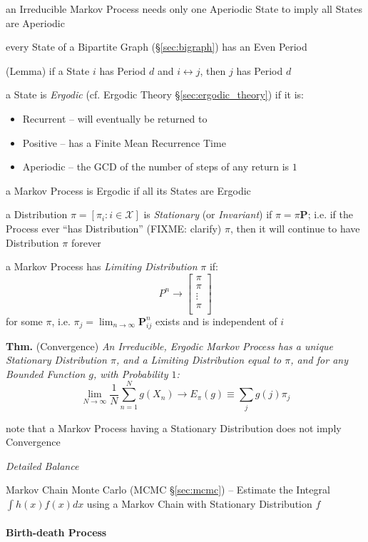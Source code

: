 an Irreducible Markov Process needs only one Aperiodic State to imply all States
are Aperiodic

every State of a Bipartite Graph (\S\ref{sec:bigraph}) has an Even Period

(Lemma) if a State $i$ has Period $d$ and $i \leftrightarrow j$, then $j$ has
Period $d$

a State is \emph{Ergodic} (cf. Ergodic Theory \S\ref{sec:ergodic_theory}) if it
is:
\begin{itemize}
  \item Recurrent -- will eventually be returned to
  \item Positive -- has a Finite Mean Recurrence Time
  \item Aperiodic -- the GCD of the number of steps of any return is $1$
\end{itemize}
a Markov Process is Ergodic if all its States are Ergodic

a Distribution $\pi = [\pi_i : i \in \mathcal{X}]$ is \emph{Stationary} (or
\emph{Invariant}) if $\pi = \pi \mathbf{P}$; i.e. if the Process ever ``has
Distribution'' (FIXME: clarify) $\pi$, then it will continue to have
Distribution $\pi$ forever

a Markov Process has \emph{Limiting Distribution} $\pi$ if:
\[
  P^n \to \begin{bmatrix}
    \pi \\
    \pi \\
    \vdots \\
    \pi \\
  \end{bmatrix}
\]
for some $\pi$, i.e. $\pi_j = \lim_{n\to\infty} \mathbf{P}_{ij}^n$
exists and is independent of $i$

\textbf{Thm.} (Convergence) \emph{
  An Irreducible, Ergodic Markov Process has a
  unique Stationary Distribution $\pi$, and a Limiting Distribution equal to
  $\pi$, and for any Bounded Function $g$, with Probability $1$:
\[
  \lim_{N\to\infty} \frac{1}{N} \sum_{n=1}^N g(X_n) \to E_\pi(g)
    \equiv \sum_j g(j) \pi_j
\]
}

note that a Markov Process having a Stationary Distribution does not imply
Convergence

\emph{Detailed Balance}

\fist Markov Chain Monte Carlo (MCMC \S\ref{sec:mcmc}) -- Estimate the Integral
$\int h(x) f(x) dx$ using a Markov Chain with Stationary Distribution $f$



\paragraph{Birth-death Process}\label{sec:birth_death}\hfill

